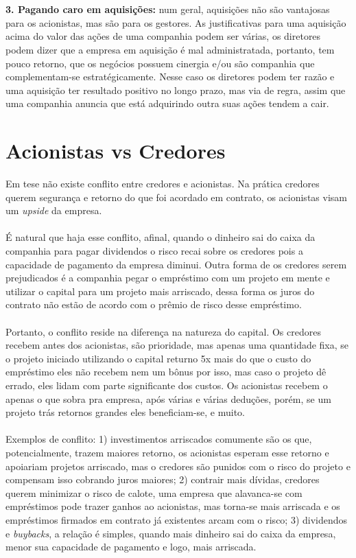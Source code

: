 \\~\\
\textbf{3. Pagando caro em aquisições:} num geral, aquisições não são vantajosas para os acionistas, mas são para os gestores. As justificativas para uma aquisição acima do valor das ações de uma companhia podem ser várias, os diretores podem dizer que a empresa em aquisição é mal administratada, portanto, tem pouco retorno, que os negócios possuem cinergia e/ou são companhia que complementam-se estratégicamente. Nesse caso os diretores podem ter razão e uma aquisição ter resultado positivo no longo prazo, mas via de regra, assim que uma companhia anuncia que está adquirindo outra suas ações tendem a cair.
\section{Acionistas vs Credores}
Em tese não existe conflito entre credores e acionistas. Na prática credores querem segurança e retorno do que foi acordado em contrato, os acionistas visam um \textit{upside} da empresa.
\\~\\
É natural que haja esse conflito, afinal, quando o dinheiro sai do caixa da companhia para pagar dividendos o risco recai sobre os credores pois a capacidade de pagamento da empresa diminui. Outra forma de os credores serem prejudicados é a companhia pegar o empréstimo com um projeto em mente e utilizar o capital para um projeto mais arriscado, dessa forma os juros do contrato não estão de acordo com o prêmio de risco desse empréstimo.
\\~\\
Portanto, o conflito reside na diferença na natureza do capital. Os credores recebem antes dos acionistas, são prioridade, mas apenas uma quantidade fixa, se o projeto iniciado utilizando o capital returno 5x mais do que o custo do empréstimo eles não recebem nem um bônus por isso, mas caso o projeto dê errado, eles lidam com parte significante dos custos. Os acionistas recebem o apenas o que sobra pra empresa, após várias e várias deduções, porém, se um projeto trás retornos grandes eles beneficiam-se, e muito.
\\~\\
Exemplos de conflito: 1) investimentos arriscados comumente são os que, potencialmente, trazem maiores retorno, os acionistas esperam esse retorno e apoiariam projetos arriscado, mas o credores são punidos com o risco do projeto e compensam isso cobrando juros maiores; 2) contrair mais dívidas, credores querem minimizar o risco de calote, uma empresa que alavanca-se com empréstimos pode trazer ganhos ao acionistas, mas torna-se mais arriscada e os empréstimos firmados em contrato já existentes arcam com o risco; 3) dividendos e \textit{buybacks}, a relação é simples, quando mais dinheiro sai do caixa da empresa, menor sua capacidade de pagamento e logo, mais arriscada.
